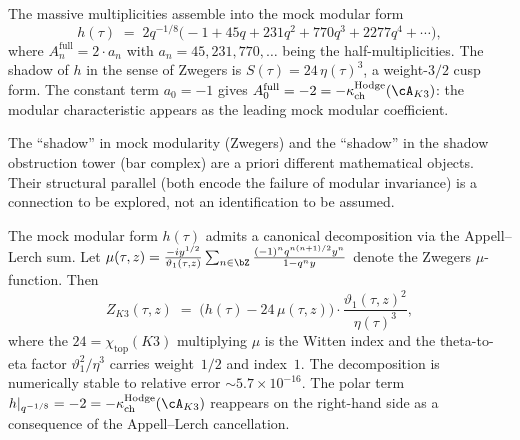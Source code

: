 \begin{remark}
\label{rem:mock-modular-k3}
The massive multiplicities assemble into the mock modular form
\begin{equation}\label{eq:mock-modular-h}
h(\tau) \;=\; 2q^{-1/8}\bigl(-1 + 45q + 231q^2
 + 770q^3 + 2277q^4 + \cdots\bigr),
\end{equation}
where $A_n^{\mathrm{full}} = 2 \cdot a_n$ with $a_n = 45, 231,
770,\ldots$ being the half-multiplicities. The shadow of $h$ in
the sense of Zwegers is $S(\tau) = 24\,\eta(\tau)^3$, a
weight-$3/2$ cusp form. The constant term $a_0 = -1$ gives
$A_0^{\mathrm{full}} = -2 = -\kappa_{\mathrm{ch}}^{\mathrm{Hodge}}(\cA_{K3})$: the modular
characteristic appears as the leading mock modular coefficient.

The ``shadow'' in mock modularity (Zwegers) and the ``shadow''
in the shadow obstruction tower (bar complex) are a priori
different mathematical objects. Their structural parallel
(both encode the failure of modular invariance) is a
connection to be explored, not an identification to be assumed.

The mock modular form $h(\tau)$ admits a canonical decomposition
via the Appell--Lerch sum. Let
$\mu(\tau,z) = \frac{-iy^{1/2}}{\vartheta_1(\tau,z)}
\sum_{n \in \bZ} \frac{(-1)^n q^{n(n+1)/2} y^n}{1 - q^n y}$
denote the Zwegers $\mu$-function. Then
\begin{equation}\label{eq:mock-modular-decomposition}
Z_{K3}(\tau,z)
\;=\;
\bigl(h(\tau) - 24\,\mu(\tau,z)\bigr)
\cdot \frac{\vartheta_1(\tau,z)^2}{\eta(\tau)^3},
\end{equation}
where the $24 = \chi_{\mathrm{top}}(K3)$ multiplying $\mu$ is the Witten
index and the theta-to-eta factor
$\vartheta_1^2/\eta^3$ carries weight~$1/2$ and index~$1$.
The decomposition is numerically stable to relative error
$\sim 5.7 \times 10^{-16}$.
The polar term $h|_{q^{-1/8}} = -2 = -\kappa_{\mathrm{ch}}^{\mathrm{Hodge}}(\cA_{K3})$
reappears on the right-hand side as a consequence of the
Appell--Lerch cancellation.
\end{remark}

